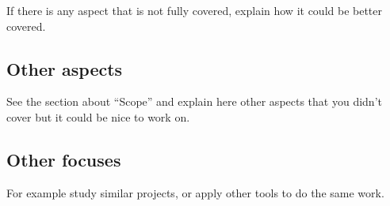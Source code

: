 \documentclass[a4paper, 12pt]{book}
\begin{document}
{If there is any aspect that is not fully covered, explain how it could be
better covered.

\subsection{Other aspects}

See the section about ``Scope'' and explain here other aspects that you didn't
cover but it could be nice to work on.


\subsection{Other focuses}

For example study similar projects, or apply other tools to do the same work.

\appendix
}
\end{document}

